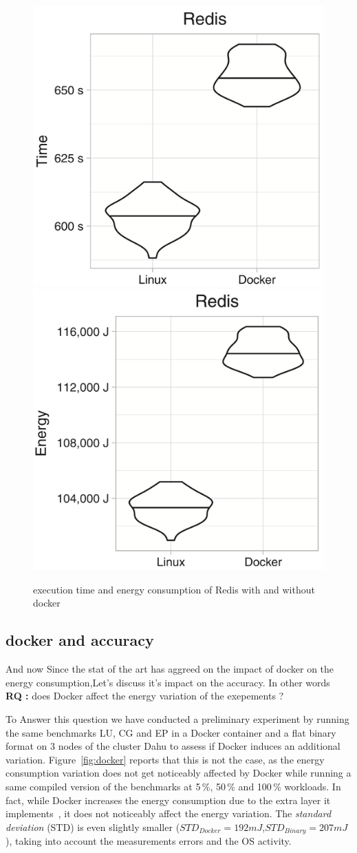 \begin{figure}
    \includegraphics[width=.5\linewidth]{imgs/docker_vs_vm_energy_paper/reddis_time}
    \includegraphics[width=.5\linewidth]{imgs/docker_vs_vm_energy_paper/reddis_energy}
    \caption{execution time and energy consumption of Redis  with and without docker \cite{santos2018does}}\label{fig:docker_reddis}
\end{figure}




\subsection{docker and accuracy}
And now Since the stat of the art has aggreed on the impact of docker on the energy consumption,Let's discuss it's impact on the accuracy. In other words\\
\textbf{RQ :} does Docker affect the energy variation of the exepements ?

To Answer this question we have conducted a preliminary experiment by running the same benchmarks \textsf{LU}, \textsf{CG} and \textsf{EP} in a Docker container and a flat binary format on 3 nodes of the cluster \textsf{Dahu} to assess if Docker induces an additional variation.
Figure~\ref{fig:docker} reports that this is not the case, as the energy consumption variation does not get noticeably affected by Docker while running a same compiled version of the benchmarks at 5\,\%, 50\,\% and 100\,\% workloads.
In fact, while Docker increases the energy consumption due to the extra layer it implements~\cite{eddie_antonio_santos_how}, it does not noticeably affect the energy variation.
The \emph{standard deviation} (STD) is even slightly smaller ($STD_{Docker}=192 mJ$,$STD_{Binary}=207 mJ$), taking into account the measurements errors and the OS activity.

